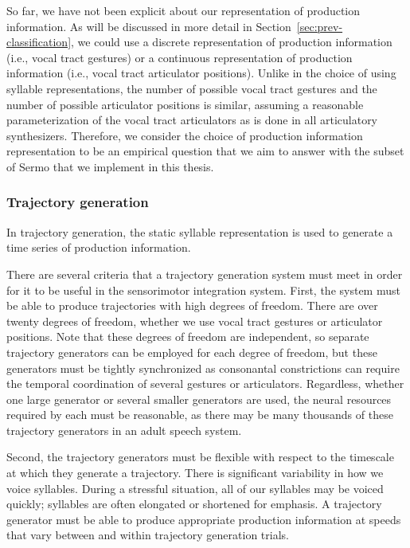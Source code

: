 So far, we have not been explicit
about our representation of production information.
As will be discussed in more detail
in Section~\ref{sec:prev-classification},
we could use a discrete representation
of production information
(i.e., vocal tract gestures)
or a continuous representation
of production information
(i.e., vocal tract articulator positions).
Unlike in the choice of
using syllable representations,
the number of possible vocal tract gestures
and the number of possible articulator positions
is similar,
assuming a reasonable parameterization
of the vocal tract articulators
as is done in all articulatory synthesizers.
Therefore, we consider the choice
of production information representation
to be an empirical question
that we aim to answer
with the subset of Sermo that we implement
in this thesis.

\subsubsection{Trajectory generation}

In trajectory generation,
the static syllable representation
is used to generate
a time series of production information.

There are several criteria
that a trajectory generation system
must meet in order for it to be
useful in the sensorimotor integration system.
First, the system must be able to produce
trajectories with high degrees of freedom.
There are over twenty degrees of freedom,
whether we use vocal tract gestures
or articulator positions.
Note that these degrees of freedom
are independent,
so separate trajectory generators
can be employed for each degree of freedom,
but these generators must be
tightly synchronized as
consonantal constrictions can require
the temporal coordination
of several gestures or articulators.
Regardless, whether one large generator
or several smaller generators are used,
the neural resources required by each
must be reasonable,
as there may be many thousands
of these trajectory generators
in an adult speech system.

Second, the trajectory generators
must be flexible with respect to
the timescale at which
they generate a trajectory.
There is significant variability
in how we voice syllables.
During a stressful situation,
all of our syllables may be
voiced quickly;
syllables are often elongated
or shortened for emphasis.
A trajectory generator must be
able to produce appropriate
production information
at speeds that vary
between and within
trajectory generation trials.

